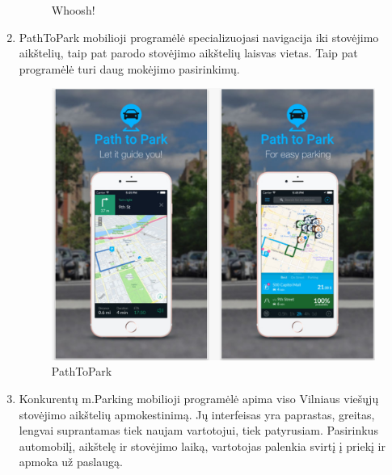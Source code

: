 \documentclass{VUMIFPSkursinis}
\begin{document}
\begin{enumerate}
\begin{samepage}
\begin{figure}[H]
				\caption{Whoosh!}
				\label{img:whoosh}
			\end{figure}
		\end{samepage}
	\newpage
	\item 
		\begin{samepage}
			PathToPark mobilioji programėlė specializuojasi navigacija iki stovėjimo aikštelių, taip pat parodo stovėjimo aikštelių laisvas vietas. Taip pat programėlė turi daug mokėjimo pasirinkimų.
			\begin{figure}[H]
				\centering
				\includegraphics[scale=0.4]{img/pathtopark}
				\caption{PathToPark}
				\label{img:pathtopark}
			\end{figure}
		\end{samepage}
	\newpage
	\item
		\begin{samepage}		
			Konkurentų m.Parking mobilioji programėlė apima viso Vilniaus viešųjų stovėjimo aikštelių apmokestinimą. Jų interfeisas yra paprastas, greitas, lengvai suprantamas tiek naujam vartotojui, tiek patyrusiam. Pasirinkus automobilį, aikštelę ir stovėjimo laiką, vartotojas palenkia svirtį į priekį ir apmoka už paslaugą.
			\begin{figure}[H]
				\centering

\end{figure}
\end{samepage}
\end{enumerate}
\end{document}
